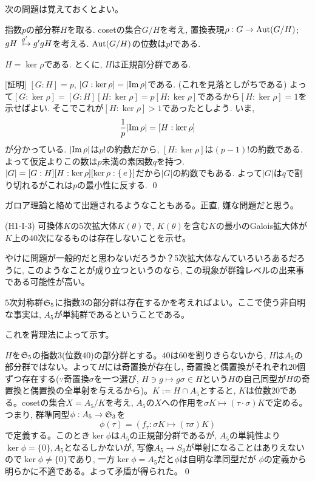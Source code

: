 次の問題は覚えておくとよい。
\begin{egans}
指数$p$の部分群$H$を取る. cosetの集合$G/H$を考え, 置換表現$\rho:G\to \mathrm{Aut}(G/H)$; $gH \xmapsto{g'} g'gH $を考える. $\mathrm{Aut}(G/H)$の位数は$p!$である.
\begin{claim}
$H = \ker{\rho}$である. とくに, $H$は正規部分群である.
\end{claim}
[証明] $[G:H]=p$, $[G:\ker{\rho}] = |\mathrm{Im}\,\rho|$である. (これを見落としがちである)  よって$[G:\ker{\rho}] = [G:H][H:\ker{\rho}] = p[H:\ker{\rho}]$であるから$[H:\ker{\rho}]=1$を示せばよい. そこでこれが$[H:\ker{\rho}] > 1$であったとしよう. いま,
\[\frac{1}{p}|\mathrm{Im}\,\rho| = [H:\ker{\rho}]\]
が分かっている. $|\mathrm{Im}\,\rho|$は$p!$の約数だから, $[H:\ker{\rho}]$は$(p-1)!$の約数である. よって仮定よりこの数は$p$未満の素因数$q$を持つ. $|G| = [G:H][H:\ker{\rho}][\ker{\rho}:\set{e}]$だから$|G|$の約数でもある. よって$|G|$は$q$で割り切れるがこれは$p$の最小性に反する. \qed
\end{egans}



ガロア理論と絡めて出題されるようなこともある。正直, 嫌な問題だと思う。
\begin{egprob} (H1-I-3)\label{prob:H1_I_3}
可換体$K$の5次拡大体$K(\theta)$で, $K(\theta)$を含む$K$の最小のGalois拡大体が$K$上の40次になるものは存在しないことを示せ。
\end{egprob}
\begin{screen}
やけに問題が一般的だと思わないだろうか？5次拡大体なんていろいろあるだろうに, このようなことが成り立つというのなら,  この現象が群論レベルの出来事である可能性が高い。
\end{screen}
\begin{ans}
$5$次対称群$\mathfrak{S}_{5}$に指数$3$の部分群は存在するかを考えればよい。ここで使う非自明な事実は, $A_5$が単純群であるということである。\par
{}これを背理法によって示す。

$H$を$\mathfrak{S}_{5}$の指数$3$(位数$40$)の部分群とする。$40$は$60$を割りきらないから, $H$は$A_{5}$の部分群ではない。よって$H$には奇置換が存在し, 奇置換と偶置換がそれぞれ$20$個ずつ存在する($\because$奇置換$\sigma$を一つ選び, $H\ni g\mapsto g\sigma\in H$という$H$の自己同型が$H$の奇置換と偶置換の全単射を与えるから)。$K:=H\cap A_5$とすると, $K$は位数$20$である。cosetの集合$X=A_{5}/K$を考え, $A_5$の$X$への作用を$\sigma K \mapsto (\tau\cdot \sigma )K$で定める。つまり, 群準同型$\phi:A_5\to \mathfrak{S}_{3}$を
\[\phi(\tau) = (f_{\tau}: \sigma K \mapsto (\tau \sigma )K)\]
で定義する。このとき$\ker{\phi}$は$A_5$の正規部分群であるが, $A_5$の単純性より$\ker{\phi} = \{ 0 \}, A_5$となるしかないが, 写像$A_5\to S_3$が単射になることはありえないので$\ker{\phi} \neq \{ 0 \}$であり, 一方$\ker{\phi} = A_5$だと$\phi$は自明な準同型だが $\phi$の定義から明らかに不適である。よって矛盾が得られた。\qed
\end{ans}



